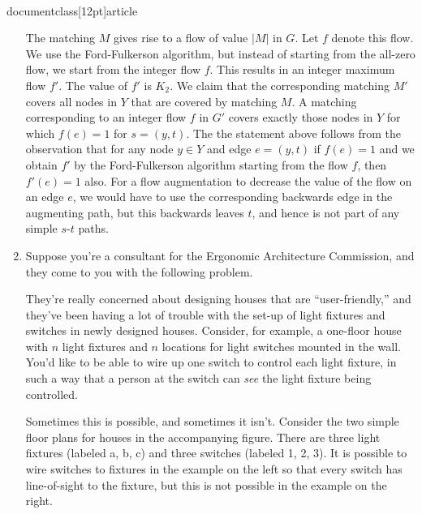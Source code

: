 \\documentclass[12pt]{article}
\begin{document}
\begin{enumerate}
{The matching $M$ gives rise to a flow of value $|M|$ in $G$. Let $f$ 
denote this flow. We use the Ford-Fulkerson algorithm,
but instead of starting from the all-zero flow, we 
start from the
integer flow $f$.
This results in an integer maximum flow $f'$. The value 
of $f'$ is $K_2$. We claim that the corresponding matching $M'$ covers
all nodes in $Y$ that are covered by matching $M$. A matching corresponding
to
an integer flow $f$ in $G'$ covers exactly those nodes in $Y$ for which 
$f(e)=1$ for $s=(y,t)$. The the statement above follows from the observation
that for any node $y \in Y$ and edge $e=(y,t)$ if $f(e)=1$ and we obtain 
$f'$ by the Ford-Fulkerson algorithm starting from the flow $f$, then 
$f'(e)=1$ also. For a flow augmentation to decrease the value of the flow
on an edge $e$, we would have to use the corresponding backwards edge in the
augmenting path, but this backwards leaves $t$, and hence is not part of 
any simple $s$-$t$ paths.
}


\item 

Suppose you're a consultant for the
Ergonomic Architecture Commission, and they come
to you with the following problem.

They're really concerned about designing houses
that are ``user-friendly,'' and they've been
having a lot of trouble with the set-up of
light fixtures and switches in newly designed houses.
Consider, for example, a one-floor house with $n$ light fixtures
and $n$ locations for light switches mounted in the wall.
You'd like to be able to wire up one switch to control
each light fixture, in such a way that a person at the
switch can {\em see} the light fixture being controlled.

Sometimes this is possible, and sometimes it isn't.
Consider the two simple floor plans for houses in
the accompanying figure.
There are three light fixtures (labeled a, b, c)
and three switches (labeled 1, 2, 3).
It is possible to wire switches to fixtures in the
example on the left so that every switch has line-of-sight
to the fixture, but this is not possible in the example on
the right.
\begin{figure}[h]
\begin{center}


\end{center}
\end{figure}
\end{enumerate}
\end{document}
